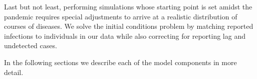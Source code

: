 Last but not least, performing simulations whose starting point is set amidst the
pandemic requires special adjustments to arrive at a realistic distribution of courses
of diseases. We solve the initial conditions problem by matching reported infections to
individuals in our data while also correcting for reporting lag and undetected cases.

In the following sections we describe each of the model components in more detail.
